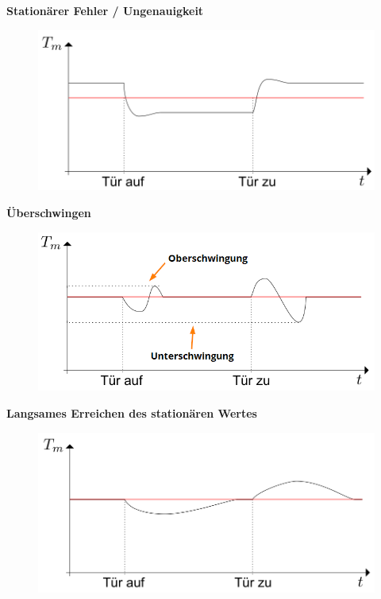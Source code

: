 \documentclass[
  10pt,
  a4paper,
]{article}
\numberwithin{equation}{section}
\begin{document}
\begin{multicols}{2}
\begin{figure}[H]
{}

\end{figure}

\textbf{Stationärer Fehler / Ungenauigkeit}

\begin{figure}[H]

{\centering \includegraphics{images/storverhalten/storverhalten_stationary.png}

}

\end{figure}

\textbf{Überschwingen}

\begin{figure}[H]

{\centering \includegraphics{images/storverhalten/uber_unterschwingung.png}

}

\end{figure}

\textbf{Langsames Erreichen des stationären Wertes}

\begin{figure}[H]

{\centering \includegraphics{images/storverhalten/slow.png}

}
\end{figure}
\end{multicols}
\end{document}
